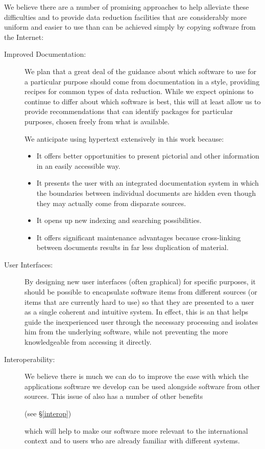 We believe there are a number of promising approaches to help
alleviate these difficulties and to provide data reduction facilities
that are considerably more uniform and easier to use than can be
achieved simply by copying software from the Internet:

\begin{description}
\item[Improved Documentation:] We plan that a great deal of the guidance
about which software to use for a particular purpose should come from
documentation in a  style, providing recipes for common
types of data reduction. While we expect opinions to continue to
differ about which software is best, this will at least allow us to
provide recommendations that can identify  packages for
particular purposes, chosen freely from what is available.

We anticipate using hypertext extensively in this work because:
\begin{itemize}
\item It offers better opportunities to present pictorial and other
information in an easily accessible way.
\item It presents the user with an integrated documentation system in
which the boundaries between individual documents are hidden even
though they may actually come from disparate sources.
\item It opens up new indexing and searching possibilities.
\item It offers significant maintenance advantages because
cross-linking between documents results in far less duplication of
material.
\end{itemize}

\item[User Interfaces:] By designing new user interfaces
(often graphical) for specific purposes, it should be possible to
encapsulate software items from different sources (or items that are
currently hard to use) so that they are presented to a user as a
single coherent and intuitive system. In effect, this is an
 that helps guide the inexperienced user
through the necessary processing and isolates him from the underlying
software, while not preventing the more knowledgeable from accessing
it directly.

\item[Interoperability:] We believe there is much we can do to improve
the ease with which the applications software we develop can be used
alongside software from other sources. This issue of
 also has a number of other
benefits\begin{latexonly} (see \S\ref{interop})\end{latexonly} which
will help to make our software more relevant to the international
context and to users who are already familiar with different systems.

\end{description}

